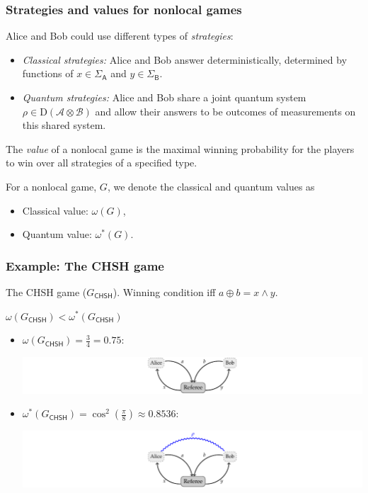 \documentclass{beamer}
\def\A{\mathcal{A}}
\def\B{\mathcal{B}}
\def\CHSH{\mathsf{CHSH}}
\def \SigmaA{\Sigma_{\reg{A}}}
\def \SigmaB{\Sigma_{\reg{B}}}
\newcommand{\setft}[1]{\mathrm{#1}}
\newcommand{\Density}{\setft{D}}
\newcommand{\reg}[1]{\mathsf{#1}}
\begin{document}
\begin{frame}
	\frametitle{Strategies and values for nonlocal games}
	Alice and Bob could use different types of \emph{strategies}:
	\vspace{2mm}
	\begin{itemize}
		\item \emph{Classical strategies:} Alice and Bob answer deterministically, determined by functions of $x \in \SigmaA$ and $y \in \SigmaB$. 
		\vspace{5mm}
		\item \emph{Quantum strategies:} Alice and Bob share a joint quantum system $\rho \in \Density(\A \otimes \B)$ and allow their answers to be outcomes of measurements on this shared system.		
	\end{itemize}
	\pause 
	\vspace{5mm}
	The \emph{value} of a nonlocal game is the maximal winning probability for the players to win over all strategies of a specified type. 
	\vspace{2mm}
	
For a nonlocal game, $G$, we denote the classical and quantum values as 
	\begin{itemize}
		\item Classical value: $\omega(G)$,
		\item Quantum value: $\omega^*(G)$.
	\end{itemize}
\end{frame}

\begin{frame}
	\frametitle{Example: The CHSH game}		
	The CHSH game ($G_{\CHSH}$). Winning condition iff $a \oplus b = x \land y$.
	\begin{center}
			$\omega(G_{\CHSH}) < \omega^*(G_{\CHSH})$
	\end{center}

	\begin{itemize}
		\item $\omega(G_{\CHSH}) = \frac{3}{4} = 0.75$:
		\begin{center}
			\includegraphics[scale=0.8]{figures/nonlocal_classical.pdf}
		\end{center}
		\item $\omega^*(G_{\CHSH}) = \cos^2(\frac{\pi}{8}) \approx 0.8536$:
		\begin{center}
			\includegraphics[scale=0.8]{figures/nonlocal_quantum.pdf}
		\end{center}		
	\end{itemize}
\end{frame}
\end{document}
